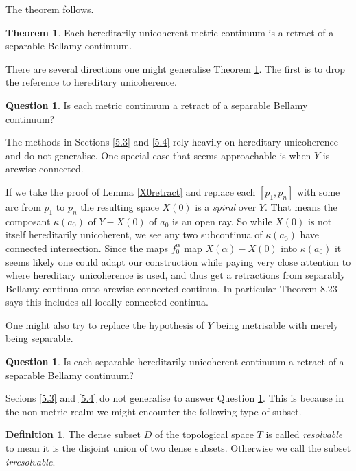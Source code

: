 \documentclass[12pt]{article}
\theoremstyle{plain}
\theoremstyle{definition}
\newtheorem{definition}[theorem]{Definition}
\newcounter{dummy}
\newcounter{dummy4}
\newcounter{dummy3}
\newcounter{dummy5}
\newtheorem{thm5}[dummy5]{Theorem}
\newcounter{qn5counter}
\newtheorem{qn5}[qn5counter]{Question}
\newcounter{dummy6}
\newcommand{\A}{\ensuremath{\alpha}}
\newcommand{\K}{\ensuremath{\kappa}}
\newcommand{\0}{\ensuremath{\varnothing}}
\begin{document}
	The theorem follows.
	
	\begin{thm5}\label{retract}
		Each  hereditarily unicoherent metric continuum is a retract of a separable Bellamy continuum.
	\end{thm5}
	
	There are several directions one might generalise Theorem \ref{retract}. The first is to drop the reference to hereditary unicoherence.
	
	\begin{qn5}
		Is each metric continuum a retract of a separable Bellamy continuum?
	\end{qn5}
	
	
	The methods in Sections \ref{5.3} and \ref{5.4} rely heavily on hereditary unicoherence and do not generalise.
	One special case that seems approachable is when $Y$ is arcwise connected. 
	
	If we take the proof of Lemma \ref{X0retract} and replace each $[p_1,p_n]$ with some arc from $p_1$ to $p_n$ the resulting space $X(0)$ is a \textit{spiral} over $Y$. That means the composant $\K(a_0)$ of $Y - X(0)$ of $a_0$ is an open ray. 
	So while $X(0)$ is not itself hereditarily unicoherent, we see any two subcontinua of $\K(a_0)$ have connected intersection.
	Since the maps $f^\A_0$ map $X(\A)-X(0)$ into $\K(a_0)$ it seems likely one could adapt our construction while paying very close attention to where hereditary unicoherence is used, and thus get a retractions from separably Bellamy continua onto arcwise connected continua. In particular \cite{nadlerbook} Theorem 8.23 says this includes all locally connected continua.
	
	One might also try to replace the hypothesis of $Y$ being metrisable with merely being separable.
	
	\begin{qn5} \label{sepretract}
		Is each separable hereditarily unicoherent continuum a retract of a separable Bellamy continuum?
	\end{qn5}
	
	Secions \ref{5.3} and \ref{5.4} do not generalise to answer Question \ref{sepretract}. 
	This is because in the non-metric realm we might encounter the following type of subset.
	
	\begin{definition}
		The dense subset $D$ of the topological space $T$ is called \textit{resolvable} to mean it is the disjoint union of two dense subsets. Otherwise we call the subset \textit{irresolvable}.
	\end{definition}
	
\end{document}
